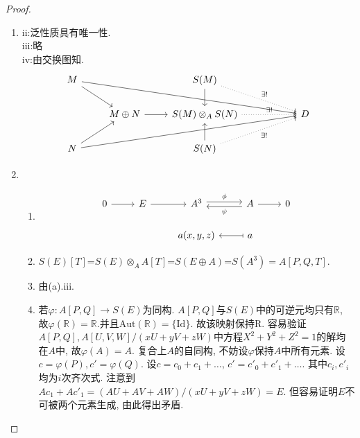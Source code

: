 \documentclass[lang=cn,12pt,a4paper]{elegantpaper.cls}
\begin{document}
\begin{enumerate}
\begin{enumerate}
\end{enumerate}
\begin{proof}
	\begin{enumerate}
		\item ii:泛性质具有唯一性.\\
		iii:略\\
		iv:由交换图知.%
		\[\begin{tikzcd}
			M && {S(M)} \\
			{} & {M\oplus N} & {S(M)\otimes_A S(N)} & {} & D \\
			N && {S(N)}
			\arrow[from=1-1, to=2-5]
			\arrow[from=3-1, to=2-5]
			\arrow[from=1-1, to=2-2]
			\arrow[from=3-1, to=2-2]
			\arrow[from=1-3, to=2-3]
			\arrow[from=3-3, to=2-3]
			\arrow["{\exists !}", dotted, from=1-3, to=2-5]
			\arrow["{\exists !}"', dotted, from=3-3, to=2-5]
			\arrow[from=2-2, to=2-3]
			\arrow["{\exists !}", dotted, from=2-3, to=2-5]
		\end{tikzcd}\]
		\item 
		\begin{enumerate}
			\item %
			\[\begin{tikzcd}
				0 & E & {A^3} & A & 0 \\
				&& {a(x,y,z)} & a
				\arrow[from=1-1, to=1-2]
				\arrow[from=1-2, to=1-3]
				\arrow["{ \phi}", shift left, from=1-3, to=1-4]
				\arrow[from=1-4, to=1-5]
				\arrow["\psi", shift left, from=1-4, to=1-3]
				\arrow[maps to, from=2-4, to=2-3]
			\end{tikzcd}\]
			\item $S(E)[T]$=$S(E)\otimes_A A[T]$=$S(E\oplus A)$=$S(A^3)=A[P,Q,T]$.
			\item 由(a).iii.
			\item 若$\varphi:A[P,Q]\rightarrow S(E)$为同构. $A[P,Q]$与$S(E)$中的可逆元均只有$\mathbb{R}$, 故$\varphi(\mathbb{R})=\mathbb{R}$.并且$\mathrm{Aut}(\mathbb{R})=\{\mathrm{Id}\}$. 故该映射保持$\mathrm{R}$. 容易验证$A[P,Q], A[U,V,W]/(xU+yV+zW)$中方程$X^2+Y^2+Z^2=1$的解均在$A$中, 故$\varphi(A)=A$. 复合上$A$的自同构, 不妨设$\varphi$保持$A$中所有元素. 设$c=\varphi(P),c'=\varphi(Q)$. 设$c=c_0+c_1+\dots$, $c'=c'_0+c'_1+\dots$. 其中$c_i,c'_i$均为$i$次齐次式. 注意到$Ac_1+Ac'_1=(AU+AV+AW)/(xU+yV+zW)=E$. 但容易证明$E$不可被两个元素生成, 由此得出矛盾. 

\end{enumerate}
\end{enumerate}
\end{proof}
\end{enumerate}
\end{document}
